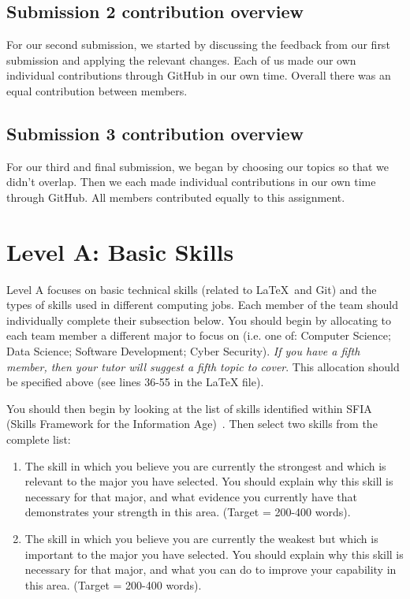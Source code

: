 \documentclass[a4paper, 11pt]{report}
\begin{document}
\subsection{Submission 2 contribution overview}

For our second submission, we started by discussing the feedback from our first submission and applying the relevant changes. Each of us made our own individual contributions through GitHub in our own time. Overall there was an equal contribution between members.

\subsection{Submission 3 contribution overview}

For our third and final submission, we began by choosing our topics so that we didn't overlap. Then we each made individual contributions in our own time through GitHub. All members contributed equally to this assignment.



\newpage
\section{Level A: Basic Skills}

Level A focuses on basic technical skills (related to \LaTeX\ and Git) and the types of skills used in different computing jobs. Each member of the team should individually complete their subsection below. You should begin by allocating to each team member a different major to focus on (i.e. one of: Computer Science; Data Science; Software Development; Cyber Security). \textit{If you have a fifth member, then your tutor will suggest a fifth topic to cover}. This allocation should be specified above (see lines 36-55 in the LaTeX file).

You should then begin by looking at the list of skills identified within SFIA (Skills Framework for the Information Age)~\cite{sfia}. Then select two skills from the complete list:
\begin{enumerate}
	\item The skill in which you believe you are currently the strongest and which is relevant to the major you have selected. You should explain why this skill is necessary for that major, and what evidence you currently have that demonstrates your strength in this area. (Target = 200-400 words).
	\item The skill in which you believe you are currently the weakest but which is important to the major you have selected. You should explain why this skill is necessary for that major, and what you can do to improve your capability in this area. (Target = 200-400 words).
\end{enumerate}
\end{document}
